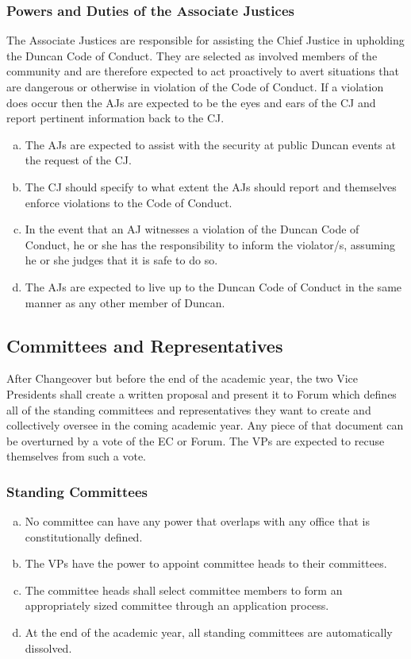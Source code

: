 \documentclass[USletter,12pt]{article}
\begin{document}
\subsubsection{Powers and Duties of the Associate Justices}
The Associate Justices are responsible for assisting the Chief Justice in upholding the Duncan Code of Conduct.  They are selected as involved members of the community and are therefore expected to act proactively to avert situations that are dangerous or otherwise in violation of the Code of Conduct.  If a violation does occur then the AJs are expected to be the eyes and ears of the CJ and report pertinent information back to the CJ.
\begin{enumerate}[(a)]
\item The AJs are expected to assist with the security at public Duncan events at the request of the CJ.
\item The CJ should specify to what extent the AJs should report and themselves enforce violations to the Code of Conduct.
\item In the event that an AJ witnesses a violation of the Duncan Code of Conduct, he or she has the responsibility to inform the violator/s, assuming he or she judges that it is safe to do so.
\item The AJs are expected to live up to the Duncan Code of Conduct in the same manner as any other member of Duncan.
\end{enumerate}


\subsection{Committees and Representatives}

After Changeover but before the end of the academic year, the two Vice Presidents shall create a written proposal and present it to Forum which defines all of the standing committees and representatives they want to create and collectively oversee in the coming academic year.  Any piece of that document can be overturned by a vote of the EC or Forum.  The VPs are expected to recuse themselves from such a vote.

\subsubsection{Standing Committees}
\begin{enumerate}[(a)]
\item No committee can have any power that overlaps with any office that is constitutionally defined.
\item The VPs have the power to appoint committee heads to their committees.
\item The committee heads shall select committee members to form an appropriately sized committee through an application process.
\item At the end of the academic year, all standing committees are automatically dissolved.
\end{enumerate}
\end{document}
